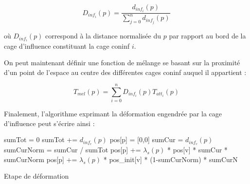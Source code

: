 \begin{displaymath}
  D_{inf_i}(p) = \frac{d_{inf_i}(p)}{\sum_{j=0}^n d_{inf_j}(p)}
\end{displaymath}

où $D_{inf_i}(p)$ correspond à la distance normalisée du $p$ par rapport au
bord de la cage d'influence constituant la cage coninf $i$.

On peut maintenant définir une fonction de mélange se basant sur la proximité
d'un point de l'espace au centre des différentes cages coninf auquel il
appartient :

\begin{displaymath}
  T_{mel}(p) = \sum_{i=0}^n D_{inf_i}(p) T_{att_i}(p)
\end{displaymath}

Finalement, l'algorithme exprimant la déformation engendrée par la cage
d'influence peut s'écrire ainsi : \\

\begin{algorithm}[H]
{
  sumTot = 0\;
  {
    sumTot += $d_{inf_c}(p)$\;
  }
  pos[p] = [0,0]\; 
  {
    sumCur = $d_{inf_c}(p)$\;
    sumCurNorm = sumCur / sumTot\;
    {
      pos[p] += $\lambda_s(p)$ * pos[v] * sumCur * sumCurNorm\;
      pos[p] += $\lambda_s(p)$ * pos\_init[v] * (1-sumCurNorm) * sumCurN\;
    }
  }
}
\caption{Etape de déformation}
\end{algorithm}

